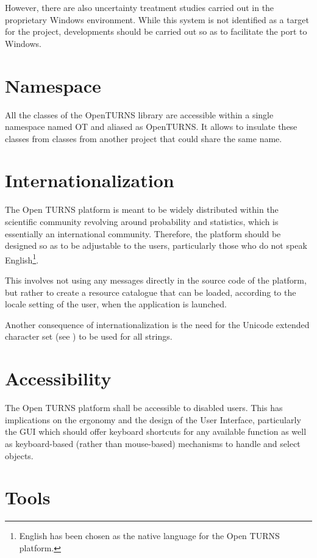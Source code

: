 However, there are also uncertainty treatment studies carried out in the proprietary Windows environment. While this system is not identified as a target for the project, developments should be carried out so as to facilitate the port to Windows.

\label{namespace}\section{Namespace}

All the classes of the OpenTURNS library are accessible within a single namespace named OT and aliased as OpenTURNS. It allows to insulate these classes from classes from another project that could share the same name.

\section{Internationalization}

The Open TURNS platform is meant to be widely distributed within the scientific community revolving around probability and statistics, which is essentially an international community. Therefore, the platform should be designed so as to be adjustable to the users, particularly those who do not speak English\footnote{English has been chosen as the native language for the Open TURNS platform.}.

This involves not using any messages directly in the source code of the platform, but rather to create a resource catalogue that can be loaded, according to the locale setting of the user, when the application is launched.

Another consequence of internationalization is the need for the Unicode extended character set (see \cite{UNICODE}) to be used for all strings.

\section{Accessibility}

The Open TURNS platform shall be accessible to disabled users. This has implications on the ergonomy and the design of the User Interface, particularly the GUI which should offer keyboard shortcuts for any available function as well as keyboard-based (rather than mouse-based) mechanisms to handle and select objects.

\section{Tools}

